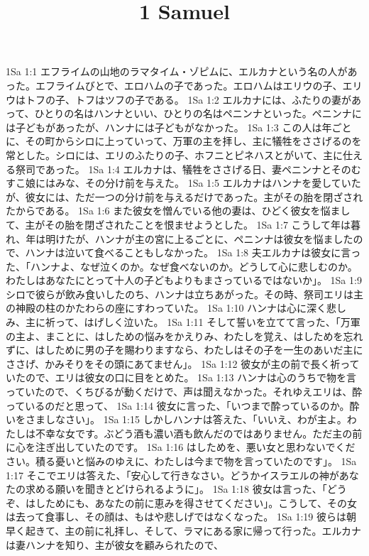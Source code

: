 

\title{1 Samuel}

1Sa 1:1  エフライムの山地のラマタイム・ゾピムに、エルカナという名の人があった。エフライムびとで、エロハムの子であった。エロハムはエリウの子、エリウはトフの子、トフはツフの子である。
1Sa 1:2  エルカナには、ふたりの妻があって、ひとりの名はハンナといい、ひとりの名はペニンナといった。ペニンナには子どもがあったが、ハンナには子どもがなかった。
1Sa 1:3  この人は年ごとに、その町からシロに上っていって、万軍の主を拝し、主に犠牲をささげるのを常とした。シロには、エリのふたりの子、ホフニとピネハスとがいて、主に仕える祭司であった。
1Sa 1:4  エルカナは、犠牲をささげる日、妻ペニンナとそのむすこ娘にはみな、その分け前を与えた。
1Sa 1:5  エルカナはハンナを愛していたが、彼女には、ただ一つの分け前を与えるだけであった。主がその胎を閉ざされたからである。
1Sa 1:6  また彼女を憎んでいる他の妻は、ひどく彼女を悩まして、主がその胎を閉ざされたことを恨ませようとした。
1Sa 1:7  こうして年は暮れ、年は明けたが、ハンナが主の宮に上るごとに、ペニンナは彼女を悩ましたので、ハンナは泣いて食べることもしなかった。
1Sa 1:8  夫エルカナは彼女に言った、「ハンナよ、なぜ泣くのか。なぜ食べないのか。どうして心に悲しむのか。わたしはあなたにとって十人の子どもよりもまさっているではないか」。
1Sa 1:9  シロで彼らが飲み食いしたのち、ハンナは立ちあがった。その時、祭司エリは主の神殿の柱のかたわらの座にすわっていた。
1Sa 1:10  ハンナは心に深く悲しみ、主に祈って、はげしく泣いた。
1Sa 1:11  そして誓いを立てて言った、「万軍の主よ、まことに、はしための悩みをかえりみ、わたしを覚え、はしためを忘れずに、はしために男の子を賜わりますなら、わたしはその子を一生のあいだ主にささげ、かみそりをその頭にあてません」。
1Sa 1:12  彼女が主の前で長く祈っていたので、エリは彼女の口に目をとめた。
1Sa 1:13  ハンナは心のうちで物を言っていたので、くちびるが動くだけで、声は聞えなかった。それゆえエリは、酔っているのだと思って、
1Sa 1:14  彼女に言った、「いつまで酔っているのか。酔いをさましなさい」。
1Sa 1:15  しかしハンナは答えた、「いいえ、わが主よ。わたしは不幸な女です。ぶどう酒も濃い酒も飲んだのではありません。ただ主の前に心を注ぎ出していたのです。
1Sa 1:16  はしためを、悪い女と思わないでください。積る憂いと悩みのゆえに、わたしは今まで物を言っていたのです」。
1Sa 1:17  そこでエリは答えた、「安心して行きなさい。どうかイスラエルの神があなたの求める願いを聞きとどけられるように」。
1Sa 1:18  彼女は言った、「どうぞ、はしためにも、あなたの前に恵みを得させてください」。こうして、その女は去って食事し、その顔は、もはや悲しげではなくなった。
1Sa 1:19  彼らは朝早く起きて、主の前に礼拝し、そして、ラマにある家に帰って行った。エルカナは妻ハンナを知り、主が彼女を顧みられたので、
